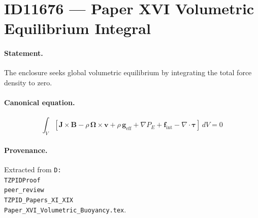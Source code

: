 \section*{ID11676 --- Paper XVI Volumetric Equilibrium Integral}

\paragraph{Statement.}
The enclosure seeks global volumetric equilibrium by integrating the total force density to zero.

\paragraph{Canonical equation.}
\[
\int_V[\mathbf{J}\times\mathbf{B}-\rho\,\bm{\Omega}\times\mathbf{v}+\rho\,\mathbf{g}_{\mathrm{eff}}+\nabla P_E+\mathbf{f}_{\mathrm{int}}-\nabla\!\cdot\bm{\tau}]\,dV=0
\]

\paragraph{Provenance.}
Extracted from \texttt{D:\\TZPIDProof\\peer\_review\\TZPID\_Papers\_XI\_XIX\\Paper\_XVI\_Volumetric\_Buoyancy.tex}.
